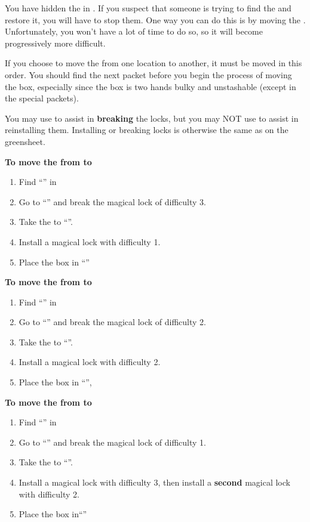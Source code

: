 \documentclass[green]{NeptuneBall}
\begin{document}
\name{\gMoveMusicBox{}}

You have hidden the \iMusicBox{} in \sPacketA{\MYloc{}}. If you suspect that someone is trying to find the \iMusicBox{\MYname} and restore it, you will have to stop them. One way you can do this is by moving the \iMusicBox{\MYname}. Unfortunately, you won't have a lot of time to do so, so it will become progressively more difficult. 

If you choose to move the \iMusicBox{\MYname} from one location to another, it must be moved in this order. You should find the next packet before you begin the process of moving the box, especially since the box is two hands bulky and unstashable (except in the special packets).

You may use \aLesserDispel{} to assist in {\bf breaking} the locks, but you may NOT use \aLesserDispel{} to assist in reinstalling them. Installing or breaking locks is otherwise the same as on the \gDecking{} greensheet. 

{\bf To move the \iMusicBox{\MYname} from \sPacketA{\MYloc{}} to \sPacketB{\MYloc{}}}
\begin{enumerate}
  \item Find ``\sPacketB{}'' in \sPacketB{\MYloc{}}
  \item Go to ``\sPacketA{}'' and break the magical lock of difficulty 3. 
  \item Take the \iMusicBox{\MYname} to ``\sPacketB{}''. 
  \item Install a magical lock with difficulty 1.
	\item Place the box in ``\sPacketB{}''
\end{enumerate}

{\bf To move the \iMusicBox{\MYname} from \sPacketB{\MYloc{}} to \sPacketC{\MYloc{}}}
\begin{enumerate}
  \item Find ``\sPacketC{}'' in \sPacketC{\MYloc{}}
  \item Go to ``\sPacketB{}'' and break the magical lock of difficulty 2. 
  \item Take the \iMusicBox{\MYname} to ``\sPacketC{}''. 
  \item Install a magical lock with difficulty 2.
	\item Place the box in ``\sPacketC{}'', 
\end{enumerate}

{\bf To move the \iMusicBox{\MYname} from \sPacketC{\MYloc{}} to \sPacketD{\MYloc{}}}
\begin{enumerate}
  \item Find ``\sPacketD{}'' in \sPacketD{\MYloc{}}
  \item Go to ``\sPacketC{}'' and break the magical lock of difficulty 1. 
  \item Take the \iMusicBox{\MYname} to ``\sPacketD{}''. 
  \item Install a magical lock with difficulty 3, then install a {\bf second} magical lock with difficulty 2.
	\item Place the box in``\sPacketD{}''
\end{enumerate}
\end{document}
